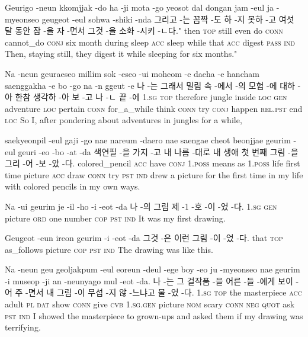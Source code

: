 \begin{example}
\tgl
		{Geurigo -neun kkomjjak -do ha -ji mota -go yeosot dal dongan jam -eul ja -myeonseo geugeot -eul sohwa -shiki -nda}
		{그리고 -는 꼼짝 -도 하 -지 못하 -고 여섯 달 동안 잠 -을 자 -면서 그것 -을 소화 -시키 -ㄴ다."}
		{then \textsc{top} still even do \textsc{conn} cannot\_do \textsc{conj} six month during sleep \textsc{acc} sleep while that \textsc{acc} digest \textsc{pass} \textsc{ind}}
		{Then, staying still, they digest it while sleeping for six months."}
\end{example}

\begin{example}
\tgl
		{Na -neun geuraeseo millim sok -eseo -ui moheom -e daeha -e hancham saenggakha -e bo -go na -n ggeut -e}
		{나 -는 그래서 밀림 속 -에서 -의 모험 -에 대하 -아 한참 생각하 -아 보 -고 나 -ㄴ 끝 -에}
		{\textsc{1.sg} \textsc{top} therefore jungle inside \textsc{loc} \textsc{gen} adventure \textsc{loc} pertain \textsc{conn} for\_a\_while think \textsc{conn} try \textsc{conj} happen \textsc{rel.pst} end \textsc{loc}}
		{So I, after pondering about adventures in jungles for a while,}
		
\tgl
		{saekyeonpil -eul gaji -go nae nareum -daero nae saengae cheot beonjjae geurim -eul geuri -eo -bo -at -da}
		{색연필 -을 가지 -고 내 나름 -대로 내 생애 첫 번째 그림 -을 그리 -어 -보 -았 -다.}
		{colored\_pencil \textsc{acc} have \textsc{conj} \textsc{1.poss} means as \textsc{1.poss} life first time picture \textsc{acc} draw \textsc{conn} try \textsc{pst} \textsc{ind}}
		{drew a picture for the first time in my life with colored pencils in my own ways.}
\end{example}

\begin{example}
\tgl
		{Na -ui geurim je -il -ho -i -eot -da}
		{나 -의 그림 제 -1 -호 -이 -었 -다.}
		{\textsc{1.sg} \textsc{gen} picture \textsc{ord} one number \textsc{cop} \textsc{pst} \textsc{ind}}
		{It was my first drawing.}
\end{example}

\begin{example}
\tgl
		{Geugeot -eun ireon geurim -i -eot -da}
		{그것 -은 이런 그림 -이 -었 -다.}
		{that \textsc{top} as\_follows picture \textsc{cop} \textsc{pst} \textsc{ind}}
		{The drawing was like this.}
\end{example}

\begin{example}
\tgl
		{Na -neun geu geoljakpum -eul eoreun -deul -ege boy -eo ju -myeonseo nae geurim -i museop -ji an -neunyago mul -eot -da.}
		{나 -는 그 걸작품 -을 어른 -들 -에게 보이 -어 주 -면서 내 그림 -이 무섭 -지 않 -느냐고 물 -었 -다.}
		{\textsc{1.sg} \textsc{top} the masterpiece \textsc{acc} adult \textsc{pl} \textsc{dat} show \textsc{conn} give \textsc{cvb} \textsc{1.sg.gen} picture \textsc{nom} scary \textsc{conn} \textsc{neg} \textsc{quot} ask \textsc{pst} \textsc{ind}}
		{I showed the masterpiece to grown-ups and asked them if my drawing was terrifying.}
\end{example}

